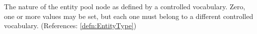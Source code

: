The nature of the entity pool node as defined
  by a controlled vocabulary. Zero, one or more values may be set, but
  each one must belong to a different controlled vocabulary.
 (References: \ref{defn:EntityType})